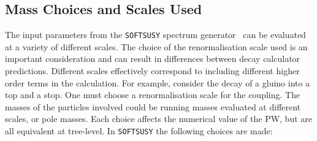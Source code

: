 \documentclass[final,3p,times,pdflatex]{elsarticle}
\begin{document}
\subsection{Mass Choices and Scales Used} \label{masschoicesandscales}
The input parameters from the {\tt SOFTSUSY} spectrum
generator~\cite{Allanach:2001kg,Allanach:2013kza} can be evaluated at a
variety of different scales. The choice of the renormalisation scale used is
an important consideration and can result in differences between decay
calculator predictions. Different scales effectively correspond to including
different higher order terms in the calculation. For example, consider the
decay of a gluino  into a top and a stop. One must choose a renormalisation
scale for the coupling. The masses of the particles involved could be running
masses evaluated at different scales, or pole masses. Each choice affects the
numerical value of the PW, but are all equivalent at tree-level. In {\tt SOFTSUSY} the following choices are made: 
\end{document}

